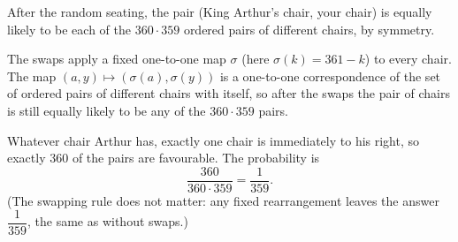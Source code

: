 After the random seating, the pair (King Arthur's chair, your chair) is equally likely to be each of the $360\cdot359$ ordered pairs of different chairs, by symmetry.

The swaps apply a fixed one-to-one map $\sigma$ (here $\sigma(k)=361-k$) to every chair. The map $(a,y)\mapsto(\sigma(a),\sigma(y))$ is a one-to-one correspondence of the set of ordered pairs of different chairs with itself, so after the swaps the pair of chairs is still equally likely to be any of the $360\cdot359$ pairs.

Whatever chair Arthur has, exactly one chair is immediately to his right, so exactly $360$ of the pairs are favourable. The probability is
\[\dfrac{360}{360\cdot359}=\boxed{\dfrac{1}{359}}.\]
(The swapping rule does not matter: any fixed rearrangement leaves the answer $\dfrac1{359}$, the same as without swaps.)
